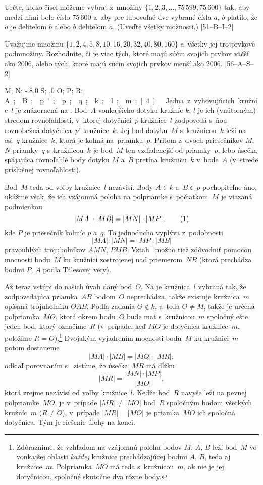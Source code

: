 {\D%
Určte, koľko čísel môžeme vybrať z~množiny
$\{1,2,3,\dots,75\,599,75\,600\}$ tak, aby medzi nimi bolo číslo 75\,600
a~aby pre ľubovoľné dve vybrané čísla $a$, $b$ platilo, že $a$ je
deliteľom $b$ alebo $b$ deliteľom $a$. (Uveďte všetky možnosti.)
[51--B--I--2]

Uvažujme množinu $\{1,2,4,5,8,10,16,20,32,40,80,160\}$
a~všetky jej trojprvkové podmnožiny. Rozhodnite, či je viac tých,
ktoré majú súčin svojich prvkov väčší ako 2006,
alebo tých, ktoré majú súčin svojich prvkov menší ako 2006.
[56--A--S--2]
}

{%
\fontplace
\rtpoint M; \ltpoint N; \bpoint\xy-.8,0 S;
\tpoint{},0 O; \rtpoint P; \tpoint R;
\bpoint\up\unit A; \lbpoint B;
\lpoint p'; \lpoint p; \tpoint q;
\rBpoint k; \bpoint l; \tpoint m;
[4] \hfil\Obr

Jedna z~vyhovujúcich kružníc~$l$ je znázornená na \obr. Bod~$A$
vonkajšieho dotyku kružníc $k$, $l$ je ich (vnútorným) stredom
rovnoľahlosti, v~ktorej dotyčnici~$p$ kružnice~$l$ zodpovedá s~ňou
rovnobežná dotyčnica~$p'$ kružnice~$k$.
Jej bod dotyku~$M$ s~kružnicou~$k$ leží na osi~$q$ kružnice~$k$,
ktorá je kolmá na~priamku~$p$. Pritom z~dvoch priesečníkov $M$, $N$
priamky~$q$ s~kružnicou~$k$ je bod~$M$ ten vzdialenejší od
priamky~$p$, lebo úsečka spájajúca rovnoľahlé
body dotyku $M$ a~$B$ pretína kružnicu~$k$ v~bode~$A$
(v~strede príslušnej rovnoľahlosti).
\inspicture{}

Bod~$M$ teda od voľby kružnice~$l$
nezávisí. Body $A\in k$ a~$B\in p$ pochopiteľne áno,
ukážme však, že ich vzájomná poloha na polpriamke s~počiatkom~$M$
je viazaná podmienkou
$$
|MA|\cdot|MB|=|MN|\cdot|MP|,       \tag1
$$
kde $P$ je priesečník kolmíc $p$ a~$q$. To jednoducho vyplýva
z~podobnosti
$$
|MA|:|MN|=|MP|:|MB|
$$
pravouhlých trojuholníkov $AMN$, $PMB$. Vzťah~
možno tiež zdôvodniť pomocou mocnosti bodu~$M$ ku kružnici
zostrojenej nad priemerom~$NB$ (ktorá prechádza bodmi $P$, $A$
podľa Tálesovej vety).

Až teraz vstúpi do našich úvah daný bod~$O$. Na  je
kružnica~$l$ vybraná tak, že zodpovedajúca priamka~$AB$ bodom~$O$
neprechádza, takže existuje kružnica~$m$ opísaná trojuholníku $OAB$.
Podľa zadania $O\notin k$, a~teda $O\ne M$, takže je určená
polpriamka~$MO$, ktorá okrem bodu~$O$ bude mať s~kružnicou~$m$
spoločný ešte jeden bod, ktorý označíme~$R$
(v~prípade, keď $MO$ je dotyčnica kružnice~$m$, položíme
$R=O$).\footnote{Zdôraznime, že vzhľadom na vzájomnú polohu
bodov $M$, $A$, $B$
leží bod~$M$ vo vonkajšej oblasti {\it každej\/}
kružnice prechádzajúcej bodmi $A$, $B$, teda aj kružnice~$m$.
Polpriamka~$MO$ má teda s~kružnicou~$m$, ak nie je jej dotyčnicou,
spoločné skutočne dva rôzne body.}
Dvojakým vyjadrením mocnosti bodu~$M$ ku kružnici~$m$ potom dostaneme
$$
|MA|\cdot|MB|=|MO|\cdot|MR|,
$$
odkiaľ porovnaním s~ zistíme, že úsečka~$MR$ má dĺžku
$$
|MR|=\frac{|MN|\cdot|MP|}{|MO|},
$$
ktorá zrejme nezávisí od voľby kružnice~$l$. Keďže
bod~$R$ navyše leží na pevnej polpriamke~$MO$, je v~prípade
$|MR|\ne|MO|$ bod~$R$ spoločným bodom všetkých kružníc~$m$ ($R\ne O$),
v~prípade $|MR|=|MO|$ je priamka~$MO$ ich spoločná dotyčnica. Tým je
riešenie úlohy na konci.


}
